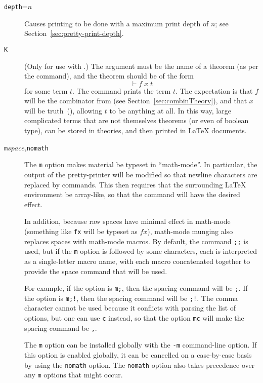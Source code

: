 \begin{description}
\item[\texttt{depth}=$n$]
Causes printing to be done with a maximum print depth of $n$; see Section~\ref{sec:pretty-print-depth}.

\item[\texttt{K}] (Only for use with \holtm.)
%
The argument must be the name of a theorem (as per the \holthm{} command), and the theorem should be of the form
\[
\vdash f\;x\;t
\]
for some term $t$.
%
The command prints the term $t$.
%
%
%
The expectation is that $f$ will be the combinator  from  (see Section~\ref{sec:combinTheory}), and that $x$ will be truth~(), allowing $t$ to be anything at all.
%
In this way, large complicated terms that are not themselves theorems (or even of boolean type), can be stored in \HOL{} theories, and then printed in \LaTeX{} documents.

\item[\texttt{m}$\mathit{space}$,\texttt{nomath}] The \texttt{m} option makes \HOL{} material be typeset in ``math-mode''.
In particular, the output of the pretty-printer will be modified so that newline characters are replaced by \texttt{\bs\bs} commands.
This then requires that the surrounding \LaTeX{} environment be array-like, so that the \texttt{\bs\bs} command will have the desired effect.

In addition, because raw spaces have minimal effect in math-mode (something like \texttt{f\textvisiblespace{}x} will be typeset as $f x$), math-mode munging also replaces spaces with math-mode macros.
By default, the command \texttt{\bs;\bs;} is used, but if the \texttt{m} option is followed by some characters, each is interpreted as a single-letter macro name, with each macro concatenated together to provide the space command that will be used.

For example, if the option is \texttt{m;}, then the spacing command will be \texttt{\bs;}.
If the option is \texttt{m;!}, then the spacing command will be \texttt{\bs;\bs!}.
The comma character cannot be used because it conflicts with parsing the list of options, but one can use \texttt{c} instead, so that the option \texttt{mc} will make the spacing command be \texttt{\bs,}.

The \texttt{m} option can be installed globally with the \texttt{-m} command-line option.
If this option is enabled globally, it can be cancelled on a case-by-case basis by using the \texttt{nomath} option.
The \texttt{nomath} option also takes precedence over any \texttt{m} options that might occur.


\end{description}
